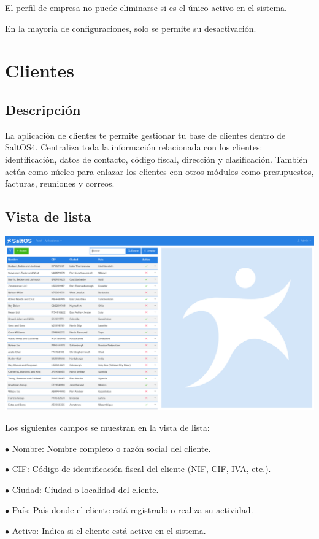 \documentclass[a4paper]{article}
\begin{document}
El perfil de empresa no puede eliminarse si es el único activo en el sistema.

En la mayoría de configuraciones, solo se permite su desactivación.


\hypertarget{toc46}{}
\section{Clientes}

\hypertarget{toc47}{}
\subsection{Descripción}

La aplicación de clientes te permite gestionar tu base de clientes dentro de SaltOS4.
Centraliza toda la información relacionada con los clientes: identificación, datos de contacto,
código fiscal, dirección y clasificación. También actúa como núcleo para enlazar los clientes con otros
módulos como presupuestos, facturas, reuniones y correos.

\hypertarget{toc48}{}
\subsection{Vista de lista}

\begin{center}\includegraphics[width=1\textwidth]{../ujest/snaps/test-screenshots-js-screenshots-crm-customers-list-es-es-1-snap.png}\end{center}

Los siguientes campos se muestran en la vista de lista:

\begin{compactitem}
\item[\color{myblue}$\bullet$] Nombre: Nombre completo o razón social del cliente.
\item[\color{myblue}$\bullet$] CIF: Código de identificación fiscal del cliente (NIF, CIF, IVA, etc.).
\item[\color{myblue}$\bullet$] Ciudad: Ciudad o localidad del cliente.
\item[\color{myblue}$\bullet$] País: País donde el cliente está registrado o realiza su actividad.
\item[\color{myblue}$\bullet$] Activo: Indica si el cliente está activo en el sistema.
\end{compactitem}
\end{document}
